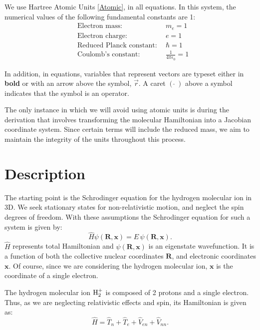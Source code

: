 We use Hartree Atomic Units \eqref{Atomic}, in all equations. In this system, the numerical values of the following fundamental constants are 1:
\setlength{\mathindent}{0pt}
\begin{equation}\label{Atomic}
\begin{split}
    & \text{Electron mass:}\ &\ m_e = 1 \\ 
    & \text{Electron charge:}\ &\ e = 1 \\
    & \text{Reduced Planck constant:}\ &\ \hbar = 1 \\
    & \text{Coulomb's constant:}\ &\ \frac{1}{4\pi\epsilon_0} = 1
\end{split}
\end{equation}

In addition, in equations, variables that represent vectors are typeset either in \textbf{bold} or with an arrow above the symbol, $ \vec{r} $. A caret $(\,\hat{}\ ) $  above a symbol indicates that the symbol is an operator.

The only instance in which we will avoid using atomic units is during the derivation that involves transforming the molecular Hamiltonian into a Jacobian coordinate system. Since certain terms will include the reduced mass, we aim to maintain the integrity of the units throughout this process.

\section{Description}
The starting point is the Schrodinger equation for the hydrogen molecular ion in 3D. We 
seek stationary states for non-relativistic motion, and neglect the spin degrees of freedom. With these assumptions the Schrodinger equation for such a system is given by:
\begin{equation}\label{sch1}
\hat{H}\psi\left(\mathbf{R},\mathbf{x}\right) = E\,\psi\left(\mathbf{R},\mathbf{x}\right).
\end{equation}
$ \hat{H} $ represents total Hamiltonian and $ \psi\left(\mathbf{R},\mathbf{x}\right) $ is an eigenstate wavefunction. It is a function of both the collective nuclear coordinates $ \mathbf{R} $,  and electronic coordinates $\mathbf{x} $. Of course, since we are considering the hydrogen molecular ion, $\mathbf{x} $ is the coordinate of a single electron.

The hydrogen molecular ion $ {\rm H}_2^{+} $ is composed of 2 protons and a single electron. Thus, as we are neglecting relativistic effects and spin, its Hamiltonian is given as:
\begin{equation}\label{hh}
\hat{H} = \hat{T}_n + \hat{T}_e + \hat{V}_{en} + \hat{V}_{nn}. 
\end{equation}

